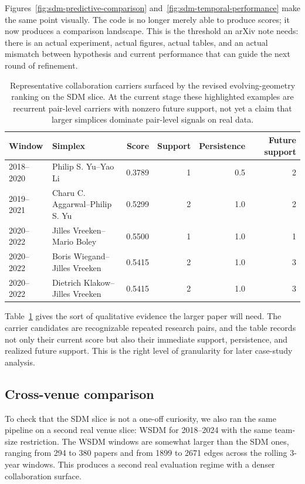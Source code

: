 \documentclass[11pt]{article}
\begin{document}
Figures~\ref{fig:sdm-predictive-comparison} and~\ref{fig:sdm-temporal-performance} make the same point visually. The code is no longer merely able to produce scores; it now produces a comparison landscape. This is the threshold an arXiv note needs: there is an actual experiment, actual figures, actual tables, and an actual mismatch between hypothesis and current performance that can guide the next round of refinement.

\begin{table}[t]
\centering
\begin{tabular}{llrrrr}
\toprule
Window & Simplex & Score & Support & Persistence & Future support \\
\midrule
2018--2020 & Philip S. Yu--Yao Li & 0.3789 & 1 & 0.5 & 2 \\
2019--2021 & Charu C. Aggarwal--Philip S. Yu & 0.5299 & 2 & 1.0 & 2 \\
2020--2022 & Jilles Vreeken--Mario Boley & 0.5500 & 1 & 1.0 & 1 \\
2020--2022 & Boris Wiegand--Jilles Vreeken & 0.5415 & 2 & 1.0 & 3 \\
2020--2022 & Dietrich Klakow--Jilles Vreeken & 0.5415 & 2 & 1.0 & 3 \\
\bottomrule
\end{tabular}
\caption{Representative collaboration carriers surfaced by the revised evolving-geometry ranking on the SDM slice. At the current stage these highlighted examples are recurrent pair-level carriers with nonzero future support, not yet a claim that larger simplices dominate pair-level signals on real data.}
\label{tab:sdm-carriers}
\end{table}

Table~\ref{tab:sdm-carriers} gives the sort of qualitative evidence the larger paper will need. The carrier candidates are recognizable repeated research pairs, and the table records not only their current score but also their immediate support, persistence, and realized future support. This is the right level of granularity for later case-study analysis.

\subsection*{Cross-venue comparison}
To check that the SDM slice is not a one-off curiosity, we also ran the same pipeline on a second real venue slice: WSDM for 2018--2024 with the same team-size restriction. The WSDM windows are somewhat larger than the SDM ones, ranging from 294 to 380 papers and from 1899 to 2671 edges across the rolling 3-year windows. This produces a second real evaluation regime with a denser collaboration surface.
\end{document}

